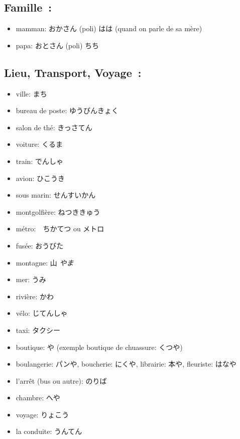 \documentclass{article}
\begin{document}
\begin{CJK}{UTF8}{min}
   \subsection{Famille~:}
   \begin{itemize}
       \item mamman: おかさん (poli) はは (quand on parle de sa mère) 
       \item papa: おとさん (poli) ちち
   \end{itemize}

   \subsection{Lieu, Transport, Voyage~:}
   \begin{itemize}
       \item ville: まち
        \item bureau de poste: ゆうびんきょく
        \item salon de thé: きっさてん
        \item voiture: くるま
        \item train: でんしゃ
        \item avion: ひこうき
        \item sous marin: せんすいかん
        \item montgolfière: ねつききゅう
        \item métro:　ちかてつ ou メトロ
        \item fusée: おうびた
        \item montagne: 山 \textit{やま}
        \item mer: うみ
        \item rivière: かわ
        \item vélo: じてんしゃ
        \item taxi: タクシー
        \item boutique: や (exemple boutique de chuassure: くつや)
        \item boulangerie: パンや, boucherie: にくや, librairie: 本や, fleuriste: はなや
        \item l'arrêt (bus ou autre): のりば
        \item chambre: へや
        \item voyage: りょこう
        \item la conduite: うんてん
   \end{itemize}


\end{CJK}
\end{document}
